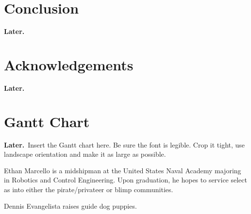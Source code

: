 \documentclass[onecolumn,10pt]{IEEEtran}
\newcommand{\myroot}{../}
\newcommand{\Later}{\textbf{Later.}}
\begin{document}

\section{Conclusion}
\Later

\section*{Acknowledgements}
\Later




\appendix
\section{Gantt Chart}
\Later\ Insert the Gantt chart here.  Be sure the font is legible.   Crop it tight, use landscape orientation and make it as large as possible.

\begin{IEEEbiography}{Ethan Marcello} is a midshipman at the United States Naval Academy majoring in Robotics and Control Engineering. Upon graduation, he hopes to service select as into either the pirate/privateer or blimp communities. 
\end{IEEEbiography}

\begin{IEEEbiography}{Dennis Evangelista} raises guide dog puppies. 
\end{IEEEbiography}
\end{document}
